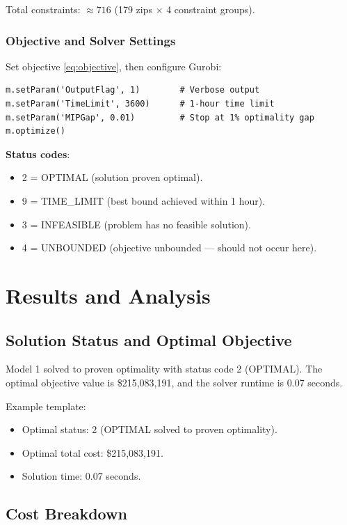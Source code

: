 \documentclass[12pt]{article}
\begin{document}
\noindent
Total constraints: $\approx 716$ (179 zips $\times$ 4 constraint groups).

\subsubsection{Objective and Solver Settings}

Set objective \eqref{eq:objective}, then configure Gurobi:

\begin{verbatim}
m.setParam('OutputFlag', 1)        # Verbose output
m.setParam('TimeLimit', 3600)      # 1-hour time limit
m.setParam('MIPGap', 0.01)         # Stop at 1% optimality gap
m.optimize()
\end{verbatim}

\noindent
\textbf{Status codes}: 
\begin{itemize}
    \item 2 = OPTIMAL (solution proven optimal).
    \item 9 = TIME\_LIMIT (best bound achieved within 1 hour).
    \item 3 = INFEASIBLE (problem has no feasible solution).
    \item 4 = UNBOUNDED (objective unbounded — should not occur here).
\end{itemize}

\section{Results and Analysis}

\subsection{Solution Status and Optimal Objective}

Model 1 solved to proven optimality with status code 2 (OPTIMAL). The optimal objective value is
\$215,083,191, and the solver runtime is 0.07 seconds.

Example template:
\begin{itemize}
    \item Optimal status: 2 (OPTIMAL solved to proven optimality).
    \item Optimal total cost: \$215,083,191.
    \item Solution time: 0.07 seconds.
\end{itemize}

\subsection{Cost Breakdown}
\end{document}
